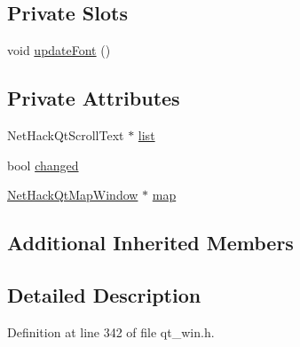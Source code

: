 \subsection*{Private Slots}
\begin{DoxyCompactItemize}
\item 
void \hyperlink{classNetHackQtMessageWindow_a80a2f45b8952799cda2b0b41c2739415}{update\+Font} ()
\end{DoxyCompactItemize}
\subsection*{Private Attributes}
\begin{DoxyCompactItemize}
\item 
Net\+Hack\+Qt\+Scroll\+Text $\ast$ \hyperlink{classNetHackQtMessageWindow_a95a5e75311d9e88d180cdf0744fe71c7}{list}
\item 
bool \hyperlink{classNetHackQtMessageWindow_a09f9f73768ca2189c3d65c7ff233bd01}{changed}
\item 
\hyperlink{classNetHackQtMapWindow}{Net\+Hack\+Qt\+Map\+Window} $\ast$ \hyperlink{classNetHackQtMessageWindow_a0a6b00320c6effcec6aa02f7d73e61bb}{map}
\end{DoxyCompactItemize}
\subsection*{Additional Inherited Members}


\subsection{Detailed Description}


Definition at line 342 of file qt\+\_\+win.\+h.



